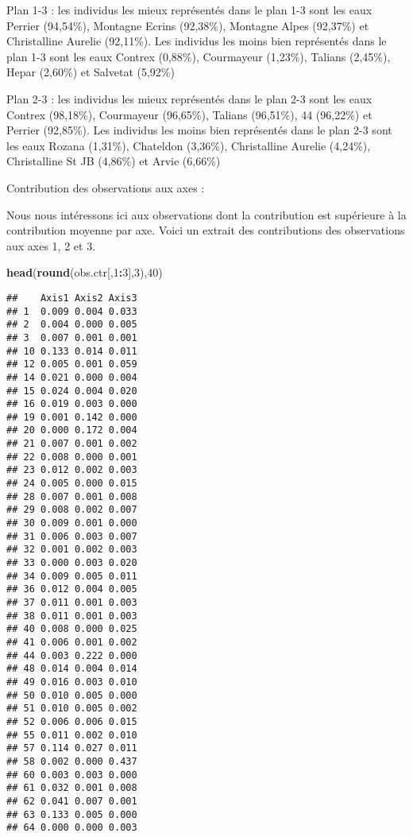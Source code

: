 \documentclass[]{article}
\newenvironment{Shaded}{\begin{snugshade}}{\end{snugshade}}
\newcommand{\KeywordTok}[1]{\textcolor[rgb]{0.13,0.29,0.53}{\textbf{#1}}}
\newcommand{\DecValTok}[1]{\textcolor[rgb]{0.00,0.00,0.81}{#1}}
\newcommand{\OperatorTok}[1]{\textcolor[rgb]{0.81,0.36,0.00}{\textbf{#1}}}
\newcommand{\NormalTok}[1]{#1}
\begin{document}
Plan 1-3 : les individus les mieux représentés dans le plan 1-3 sont les
eaux Perrier (94,54\%), Montagne Ecrins (92,38\%), Montagne Alpes
(92,37\%) et Christalline Aurelie (92,11\%). Les individus les moins
bien représentés dans le plan 1-3 sont les eaux Contrex (0,88\%),
Courmayeur (1,23\%), Talians (2,45\%), Hepar (2,60\%) et Salvetat
(5,92\%)

Plan 2-3 : les individus les mieux représentés dans le plan 2-3 sont les
eaux Contrex (98,18\%), Courmayeur (96,65\%), Talians (96,51\%), 44
(96,22\%) et Perrier (92,85\%). Les individus les moins bien représentés
dans le plan 2-3 sont les eaux Rozana (1,31\%), Chateldon (3,36\%),
Christalline Aurelie (4,24\%), Christalline St JB (4,86\%) et Arvie
(6,66\%)

Contribution des observations aux axes :

Nous nous intéressons ici aux observations dont la contribution est
supérieure à la contribution moyenne par axe. Voici un extrait des
contributions des observations aux axes 1, 2 et 3.

\begin{Shaded}
\begin{Highlighting}[]
\KeywordTok{head}\NormalTok{(}\KeywordTok{round}\NormalTok{(obs.ctr[,}\DecValTok{1}\OperatorTok{:}\DecValTok{3}\NormalTok{],}\DecValTok{3}\NormalTok{),}\DecValTok{40}\NormalTok{)}
\end{Highlighting}
\end{Shaded}

\begin{verbatim}
##    Axis1 Axis2 Axis3
## 1  0.009 0.004 0.033
## 2  0.004 0.000 0.005
## 3  0.007 0.001 0.001
## 10 0.133 0.014 0.011
## 12 0.005 0.001 0.059
## 14 0.021 0.000 0.004
## 15 0.024 0.004 0.020
## 16 0.019 0.003 0.000
## 19 0.001 0.142 0.000
## 20 0.000 0.172 0.004
## 21 0.007 0.001 0.002
## 22 0.008 0.000 0.001
## 23 0.012 0.002 0.003
## 24 0.005 0.000 0.015
## 28 0.007 0.001 0.008
## 29 0.008 0.002 0.007
## 30 0.009 0.001 0.000
## 31 0.006 0.003 0.007
## 32 0.001 0.002 0.003
## 33 0.000 0.003 0.020
## 34 0.009 0.005 0.011
## 36 0.012 0.004 0.005
## 37 0.011 0.001 0.003
## 38 0.011 0.001 0.003
## 40 0.008 0.000 0.025
## 41 0.006 0.001 0.002
## 44 0.003 0.222 0.000
## 48 0.014 0.004 0.014
## 49 0.016 0.003 0.010
## 50 0.010 0.005 0.000
## 51 0.010 0.005 0.002
## 52 0.006 0.006 0.015
## 55 0.011 0.002 0.010
## 57 0.114 0.027 0.011
## 58 0.002 0.000 0.437
## 60 0.003 0.003 0.000
## 61 0.032 0.001 0.008
## 62 0.041 0.007 0.001
## 63 0.133 0.005 0.000
## 64 0.000 0.000 0.003
\end{verbatim}
\end{document}
